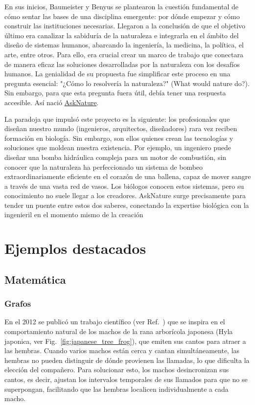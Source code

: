 \documentclass[twocolumn,amsmath,amssymb,aps,floatfix]{revtex4-2}
\begin{document}
En sus inicios, Baumeister y Benyus se plantearon la cuestión fundamental de cómo sentar las bases de una disciplina emergente:
por dónde empezar y cómo construir las instituciones necesarias. Llegaron a la conclusión de que el objetivo último era canalizar
la sabiduría de la naturaleza e integrarla en el ámbito del diseño de sistemas humanos, abarcando la ingeniería, la medicina,
la política, el arte, entre otros. Para ello, era crucial crear un marco de trabajo que conectara de manera eficaz las soluciones
desarrolladas por la naturaleza con los desafíos humanos. La genialidad de su propuesta fue simplificar este proceso en una pregunta
esencial: "¿Cómo lo resolvería la naturaleza?" (What would nature do?). Sin embargo, para que esta pregunta fuera útil, debía tener
una respuesta accesible. Así nació \href{https://asknature.org/}{AskNature}.

La paradoja que impulsó este proyecto es la siguiente: los profesionales que diseñan nuestro mundo (ingenieros, arquitectos,
diseñadores) rara vez reciben formación en biología. Sin embargo, son ellos quienes crean las tecnologías y soluciones que moldean
nuestra existencia. Por ejemplo, un ingeniero puede diseñar una bomba hidráulica compleja para un motor de combustión, sin conocer
que la naturaleza ha perfeccionado un sistema de bombeo extraordinariamente eficiente en el corazón de una ballena, capaz de mover
sangre a través de una vasta red de vasos. Los biólogos conocen estos sistemas, pero su conocimiento no suele llegar a los creadores.
AskNature surge precisamente para tender un puente entre estos dos saberes, conectando la expertise biológica con la ingenieril en
el momento mismo de la creación


\section{Ejemplos destacados}

\subsection{Matemática}

\subsubsection{Grafos}

En el 2012 se publicó un trabajo científico (ver Ref.~\cite{Hernandez2012}) que se inspira en el comportamiento
natural de los machos de la rana arborícola japonesa (Hyla japonica, ver Fig.~\ref{fig:japanese_tree_frog}),
que emiten sus cantos para atraer a las hembras. Cuando varios machos están cerca
y cantan simultáneamente, las hembras no pueden distinguir de dónde provienen las llamadas, lo que dificulta la elección del compañero. Para solucionar
esto, los machos desincronizan sus cantos, es decir, ajustan los intervalos temporales de sus llamados para que no se superpongan, facilitando que las
hembras localicen individualmente a cada macho.
\end{document}
